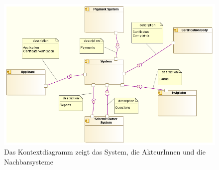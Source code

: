 \begin{figure}[H]
    \centering
    \includegraphics[scale=0.5]{uml/context.png}
    \caption{Das Kontextdiagramm zeigt das System, die AkteurInnen und die Nachbarsysteme}
\end{figure}